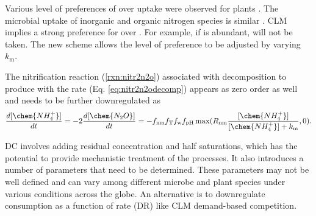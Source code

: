 \documentclass[gmd, manuscript]{copernicus}
\begin{document}
Various level of preferences of  over  uptake were observed for plants
\citep{Pfautsch2009,Warren2007,Nordin2001,Falkengren1995,Gherardi2013}. The
microbial uptake of inorganic and organic nitrogen species is similar
\citep{Fouilland2007,Kirchman1994,Kirchman1998,Middelburg2000,Veuger2004}. CLM
implies a strong preference for  over . For example, if
 is abundant,  will not be taken. The new scheme
allows the level of preference to be adjusted by varying $k_\text{m}$.

The nitrification reaction (\ref{rxn:nitr2n2o}) associated with decomposition
to produce  with the rate (Eq. \ref{eq:nitr2n2odecomp}) appears as
zero order as well and needs to be further downregulated as %
\begin{equation}
\frac{d [\chem{NH_4^+}]}{d t} = -2\frac{d
[\chem{N_2O}]}{d t} = -f_\text{nm} f_\text{T} f_\text{w}
f_\text{pH}\max(R_\text{nm}\frac{[\chem{NH_4^+}]}{[\chem{NH_4^+}]+k_\text{m}},0).
\label{eq:nitr2n2odecompdownregulated}
\end{equation}

DC involves adding residual concentration and half saturations, which has the
potential to provide mechanistic treatment of the processes. It also introduces
a number of parameters that need to be determined. These parameters may not be
well defined and can vary among different microbe and plant species under
various conditions across the globe. 
An alternative is to downregulate consumption as a function of rate (DR) like
CLM demand-based competition. 
\end{document}
